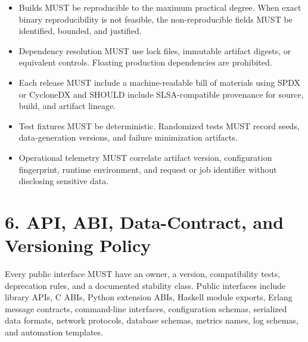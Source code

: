 \documentclass[11pt]{article}
\begin{document}
\begin{itemize}
  \item Builds MUST be reproducible to the maximum practical degree. When exact binary reproducibility is not feasible, the non-reproducible fields MUST be identified, bounded, and justified.
  \item Dependency resolution MUST use lock files, immutable artifact digests, or equivalent controls. Floating production dependencies are prohibited.
  \item Each release MUST include a machine-readable bill of materials using SPDX or CycloneDX and SHOULD include SLSA-compatible provenance for source, build, and artifact lineage.
  \item Test fixtures MUST be deterministic. Randomized tests MUST record seeds, data-generation versions, and failure minimization artifacts.
  \item Operational telemetry MUST correlate artifact version, configuration fingerprint, runtime environment, and request or job identifier without disclosing sensitive data.
\end{itemize}

\hypertarget{sec-compatibility-versioning}{}
\section*{6. API, ABI, Data-Contract, and Versioning Policy}
Every public interface MUST have an owner, a version, compatibility tests, deprecation rules, and a documented stability class. Public interfaces include library APIs, C ABIs, Python extension ABIs, Haskell module exports, Erlang message contracts, command-line interfaces, configuration schemas, serialized data formats, network protocols, database schemas, metrics names, log schemas, and automation templates.
\end{document}

